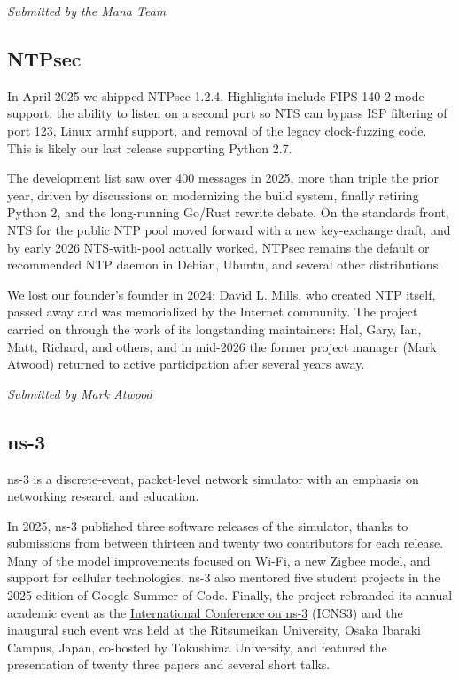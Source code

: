 \documentclass[a4paper]{report}
\begin{document}
{\em Submitted by the Mana Team}

\subsection{NTPsec}

In April 2025 we shipped NTPsec 1.2.4. Highlights include FIPS-140-2 mode support, the ability to listen on a second port so NTS can bypass ISP filtering of port 123, Linux armhf support, and removal of the legacy clock-fuzzing code. This is likely our last release supporting Python 2.7.

The development list saw over 400 messages in 2025, more than triple the prior year, driven by discussions on modernizing the build system, finally retiring Python 2, and the long-running Go/Rust rewrite debate. On the standards front, NTS for the public NTP pool moved forward with a new key-exchange draft, and by early 2026 NTS-with-pool actually worked. NTPsec remains the default or recommended NTP daemon in Debian, Ubuntu, and several other distributions.

We lost our founder's founder in 2024: David L. Mills, who created NTP itself, passed away and was memorialized by the Internet community. The project carried on through the work of its longstanding maintainers: Hal, Gary, Ian, Matt, Richard, and others, and in mid-2026 the former project manager (Mark Atwood) returned to active participation after several years away.

{\em Submitted by Mark Atwood}

\subsection{ns-3}

ns-3 is a discrete-event, packet-level network simulator with an emphasis on networking research and education.

In 2025, ns-3 published three software releases of the simulator, thanks to submissions from between thirteen and twenty two contributors for each release. Many of the model improvements focused on Wi-Fi, a new Zigbee model, and support for cellular technologies. ns-3 also mentored five student projects in the 2025 edition of Google Summer of Code. Finally, the project rebranded its annual academic event as the \href{https://dl.acm.org/doi/proceedings/10.1145/3747204}{International Conference on ns-3} (ICNS3) and the inaugural such event was held at the Ritsumeikan University, Osaka Ibaraki Campus, Japan, co-hosted by Tokushima University, and featured the presentation of twenty three papers and several short talks.
\end{document}
